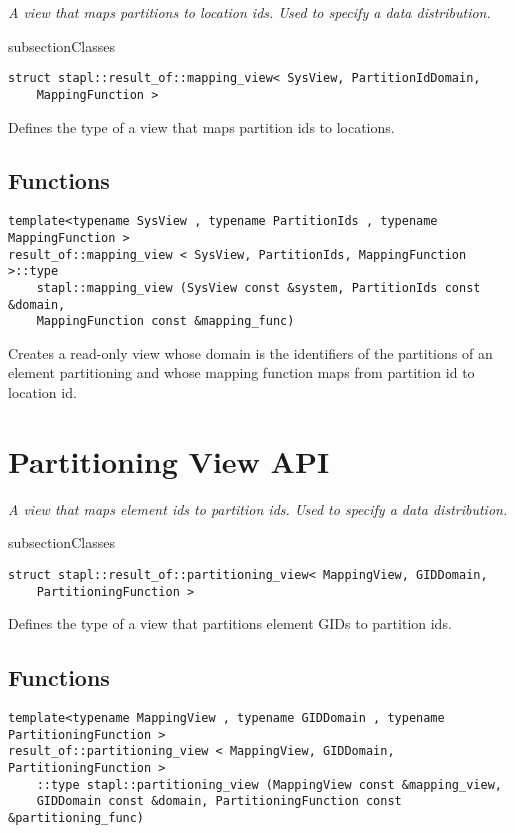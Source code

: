 \emph{A view that maps partitions to location ids.  Used to specify a data distribution. }

subsection{Classes}

\begin{verbatim}
struct stapl::result_of::mapping_view< SysView, PartitionIdDomain,
    MappingFunction >
\end{verbatim}

Defines the type of a view that maps partition ids to locations.

\subsection{Functions}

\begin{verbatim}
template<typename SysView , typename PartitionIds , typename MappingFunction >
result_of::mapping_view < SysView, PartitionIds, MappingFunction >::type
    stapl::mapping_view (SysView const &system, PartitionIds const &domain,
    MappingFunction const &mapping_func)
\end{verbatim}

Creates a read-only view whose domain is the identifiers of the partitions of an element partitioning and whose mapping function maps from partition id to location id.

\section{Partitioning View API} \label{sec-dist-part-vw}

\emph{A view that maps element ids to partition ids.
Used to specify a data distribution. }

subsection{Classes}

\begin{verbatim}
struct stapl::result_of::partitioning_view< MappingView, GIDDomain,
    PartitioningFunction >
\end{verbatim}

Defines the type of a view that partitions element GIDs to partition ids.

\subsection{Functions}

\begin{verbatim}
template<typename MappingView , typename GIDDomain , typename PartitioningFunction >
result_of::partitioning_view < MappingView, GIDDomain, PartitioningFunction >
    ::type stapl::partitioning_view (MappingView const &mapping_view,
    GIDDomain const &domain, PartitioningFunction const &partitioning_func)
\end{verbatim}

